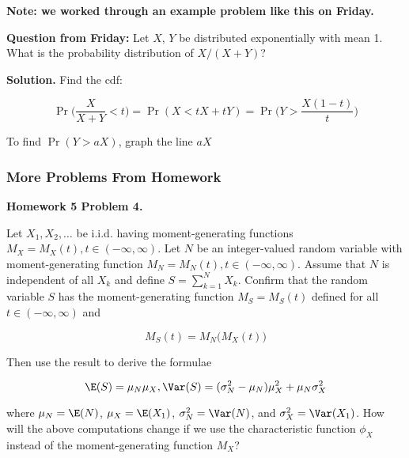 \begin{enumerate}[(1)]

\textbf{Note: we worked through an example problem like this on Friday.}

\textbf{Question from Friday:} Let \(X\), \(Y\) be distributed exponentially with mean 1. What is the probability distribution of \(X/(X+Y)\)?

\textbf{Solution.} Find the cdf:

\[
\Pr \bigg( \frac{X}{X+Y}  < t \bigg) = \Pr ( X < tX + tY) = \Pr \bigg( Y > \frac{X(1-t)}{t} \bigg) 
\]

To find \(\Pr(Y > aX)\), graph the line \(aX\) 

\end{enumerate}

\subsubsection{More Problems From Homework}


\textbf{Homework 5 Problem 4.}

Let \(X_1, X_2, \ldots\) be i.i.d. having moment-generating functions \(M_X = M_X(t), t \in (-\infty, \infty)\). Let \(N\) be an integer-valued random variable with moment-generating function \(M_N = M_N(t), t \in (-\infty, \infty)\). Assume that \(N\) is independent of all \(X_k\) and define \(S = \sum_{k=1}^N X_k\). Confirm that the random variable \(S\) has the moment-generating function \(M_S = M_S(t)\) defined for all \(t \in (-\infty, \infty)\) and 

\[
M_S(t) = M_N \big(M_X(t) \big)
\]

Then use the result to derive the formulae

\[
\E(S) = \mu_N \mu_X, \Var(S) = (\sigma_N^2  -\mu_N)\mu_X^2 + \mu_N \sigma_X^2
\]

where \(\mu_N = \E(N)\), \(\mu_X = \E(X_1)\), \(\sigma_N^2 = \Var(N)\), and \(\sigma_X^2 = \Var(X_1)\). How will the above computations change if we use the characteristic function \(\phi_X\) instead of the moment-generating function \(M_X\)? 

